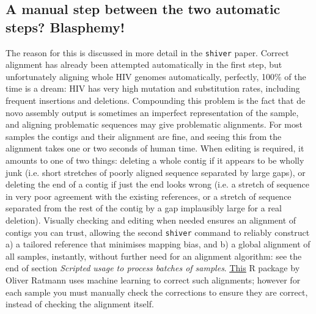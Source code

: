 \documentclass{article}
\newcommand{\shiv}{\texttt{shiver}\xspace}
\newcommand{\www}{\color{blue} \underline}
\begin{document}
\subsection*{A manual step between the two automatic steps? Blasphemy!}
The reason for this is discussed in more detail in the \shiv paper.
Correct alignment has already been attempted automatically in the first step, but unfortunately aligning whole HIV genomes automatically, perfectly, 100\% of the time is a dream: HIV has very high mutation and substitution rates, including frequent insertions and deletions.
Compounding this problem is the fact that de novo assembly output is sometimes an imperfect representation of the sample, and aligning problematic sequences may give problematic alignments. 
For most samples the contigs and their alignment are fine, and seeing this from the alignment takes one or two seconds of human time.
When editing is required, it amounts to one of two things: deleting a whole contig if it appears to be wholly junk (i.e. short stretches of poorly aligned sequence separated by large gaps), or deleting the end of a contig if just the end looks wrong (i.e. a stretch of sequence in very poor agreement with the existing references, or a stretch of sequence separated from the rest of the contig by a gap implausibly large for a real deletion).
Visually checking and editing when needed ensures an alignment of contigs you can trust, allowing the second \shiv command to reliably construct a) a tailored reference that minimises mapping bias, and b) a global alignment of all samples, instantly, without further need for an alignment algorithm: see the end of section {\it Scripted usage to process batches of samples}.  
\href{https://github.com/olli0601/PANGEAhaircut}{\www{This}} R package by Oliver Ratmann uses machine learning to correct such alignments; however for each sample you must manually check the corrections to ensure they are correct, instead of checking the alignment itself.
\end{document}
